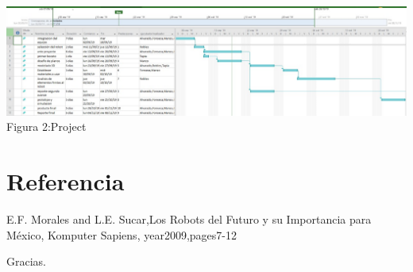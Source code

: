\documentclass[12pt,a4paper]{report}
\begin{document}
\centering
  \includegraphics[scale=.5]{Project.png}\\
    Figura 2:Project
  


\section{Referencia}

  E.F. Morales and L.E. Sucar,Los Robots del Futuro y su Importancia para M\'exico, Komputer Sapiens,
  year{2009},pages{7-12}








\begin{center}
Gracias.
\end{center}
\end{document}
